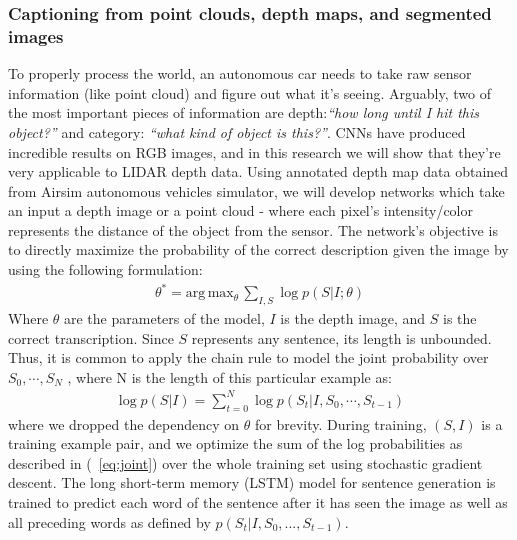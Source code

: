 \subsubsection{Captioning from point clouds, depth maps, and segmented images}
\label{subsec:point_cloud}

To properly process the world, an autonomous car needs to take raw sensor information (like point cloud) and figure out what it’s seeing.
Arguably, two of the most important pieces of information are depth:\textit{``how long until I hit this object?''} and category: \textit{``what kind of object is this?''}.
CNNs have produced incredible results on RGB images, and in this research we will show that they're very applicable to LIDAR depth data.
Using annotated depth map data obtained from Airsim autonomous vehicles simulator, we will develop networks which take an input a depth image or a point cloud - where each pixel's intensity/color represents the distance of the object from the sensor. 
The network's objective is to directly maximize the probability of the correct description given the image by using the following
formulation:
\begin{align}
     \theta^* = \text{arg} \, \text{max}_{\theta} \, \sum_{I,S} \log p(S|I;\theta)
\end{align}
Where $\theta$ are the parameters of the model, $I$ is the depth image, and $S$ is the correct transcription.  Since $S$ represents any sentence, its length is unbounded. Thus, it is common to apply the chain rule to model the joint probability over $S_0, \cdots, S_N$ , where N is the length of this particular example as:
\begin{align}
     \log p(S|I) = \sum_{t=0}^{N} \log p(S_t|I, S_0, \cdots, S_{t-1})
     \label{eq:joint}
\end{align}
where we dropped the dependency on $\theta$ for brevity.
During training, $(S, I)$ is a training example pair, and we optimize the sum of the log probabilities as described in (~\ref{eq:joint}) over the whole training set using stochastic gradient descent.
The long short-term memory (LSTM) model for sentence generation is trained to predict each word of the sentence after it has seen the image as well as all preceding words as defined by $p(S_t|I, S_0, . . . , S_{t-1})$.
